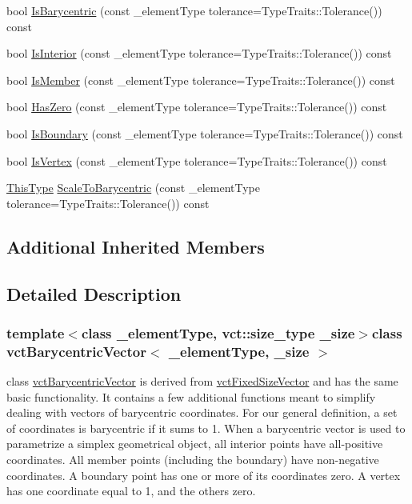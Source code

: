 \begin{DoxyCompactItemize}
\item 
bool \hyperlink{classvct_barycentric_vector_a2de0ea268bd899edf9feca4521e3c1b2}{Is\-Barycentric} (const \-\_\-element\-Type tolerance=Type\-Traits\-::\-Tolerance()) const 
\item 
bool \hyperlink{classvct_barycentric_vector_a06b03cc53b33eb0399e3aa5d4efc2b61}{Is\-Interior} (const \-\_\-element\-Type tolerance=Type\-Traits\-::\-Tolerance()) const 
\item 
bool \hyperlink{classvct_barycentric_vector_a57df6ff1bfb5a276a1b6c27fc760275c}{Is\-Member} (const \-\_\-element\-Type tolerance=Type\-Traits\-::\-Tolerance()) const 
\item 
bool \hyperlink{classvct_barycentric_vector_ac82837145f5adb20ebe37b807754abd5}{Has\-Zero} (const \-\_\-element\-Type tolerance=Type\-Traits\-::\-Tolerance()) const 
\item 
bool \hyperlink{classvct_barycentric_vector_a713cf8f0f4e3d3faaaca127a3e18c640}{Is\-Boundary} (const \-\_\-element\-Type tolerance=Type\-Traits\-::\-Tolerance()) const 
\item 
bool \hyperlink{classvct_barycentric_vector_a9c71ba81472565ed088271e92cb546c4}{Is\-Vertex} (const \-\_\-element\-Type tolerance=Type\-Traits\-::\-Tolerance()) const 
\item 
\hyperlink{classvct_barycentric_vector_af89123d5c607a28e2328d5d370dffb33}{This\-Type} \hyperlink{classvct_barycentric_vector_ab4436ebd020f3dcf542392391fe502c6}{Scale\-To\-Barycentric} (const \-\_\-element\-Type tolerance=Type\-Traits\-::\-Tolerance()) const 
\end{DoxyCompactItemize}
\subsection*{Additional Inherited Members}


\subsection{Detailed Description}
\subsubsection*{template$<$class \-\_\-element\-Type, vct\-::size\-\_\-type \-\_\-size$>$class vct\-Barycentric\-Vector$<$ \-\_\-element\-Type, \-\_\-size $>$}

class \hyperlink{classvct_barycentric_vector}{vct\-Barycentric\-Vector} is derived from \hyperlink{classvct_fixed_size_vector}{vct\-Fixed\-Size\-Vector} and has the same basic functionality. It contains a few additional functions meant to simplify dealing with vectors of barycentric coordinates. For our general definition, a set of coordinates is barycentric if it sums to 1. When a barycentric vector is used to parametrize a simplex geometrical object, all interior points have all-\/positive coordinates. All member points (including the boundary) have non-\/negative coordinates. A boundary point has one or more of its coordinates zero. A vertex has one coordinate equal to 1, and the others zero.

